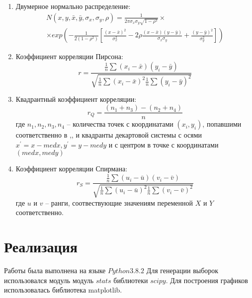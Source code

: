 \documentclass[a4]{article}
\newcommand{\RomanNumeralCaps}[1]
    {\MakeUppercase{\romannumeral #1}}
\begin{document}
\begin{enumerate}
    \item Двумерное нормально распределение:
        \begin{multline}
        N(x,y,\bar{x},\bar{y},\sigma_{x},\sigma_{y},\rho)=\frac{1}{2\pi\sigma_{x}\sigma_{y}\sqrt{1-\rho^{2}}}\times\\
        \times exp(-\frac{1}{2(1-\rho^{2})}[\frac{(x-\bar{x})^{2}}{\sigma_{x}^{2}}-2\rho\frac{(x-\bar{x})(y-\bar{y})}{\sigma_{x}\sigma_{y}}+\frac{(y-\bar{y})^{2}}{\sigma_{y}^{2}}])
        \end{multline}
    
    \item Коэффициент корреляции Пирсона:
        \begin{equation}
        r=\frac{\frac{1}{n}\sum(x_{i}-\bar{x})(y_{i}-\bar{y})}{\sqrt{\frac{1}{n}\sum(x_{i}-\bar{x})^{2}\frac{1}{n}\sum(y_{i}-\bar{y})^{2}}}
        \end{equation}
        
        \item Квадрантный коэффициент корреляции:
        \begin{equation}
        r_{Q} = \frac{(n_{1} + n_{3}) - (n_{2} + n_{4})}{n}
        \end{equation}
        где $ n_{1},n_{2},n_{3},n_{4} $ -- количества точек с координатами $ (x_{i},y_{i}) $, попавшими соответственно в \RomanNumeralCaps{1},\RomanNumeralCaps{2},\RomanNumeralCaps{3} и \RomanNumeralCaps{4} квадранты декартовой системы с осями $x^{'}=x-med x, y^{'}=y-med y  $ и с центром в точке с координатами$ (med x, med y) $
    \item Коэффициент корреляции Спирмана:
        \begin{equation}
        r_{S}=\frac{\frac{1}{n}\sum(u_{i}-\bar{u})(v_{i}-\bar{v})}{\sqrt{\frac{1}{n}\sum(u_{i}-\bar{u})^{2}\frac{1}{n}\sum(v_{i}-\bar{v})^{2}}}
        \end{equation}
        где $ u $ и $ v $ -- ранги, соотвествующие значениям переменной $X$ и $ Y $ соответственно.
        
\end{enumerate}

\section{Реализация}
Работы была выполнена на языке $Python 3.8.2$
Для генерации выборок использовался модуль модуль $stats$ библиотеки $scipy$.
Для построения графиков использовалась библиотека matplotlib.
\end{document}

